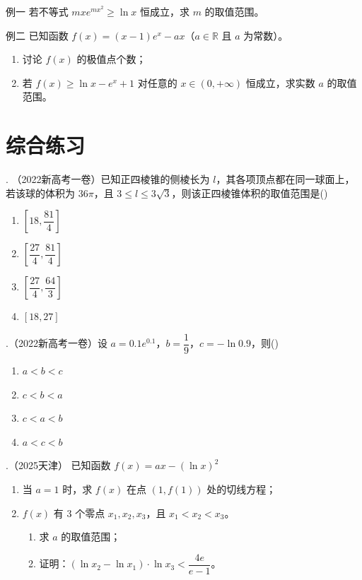 \documentclass{article}
\begin{document}
例一\;\; \noindent 若不等式 \(mx e^{mx^2} \geq \ln x\) 恒成立，求 \(m\) 的取值范围。
\vspace{10\baselineskip}

例二 \;\;已知函数 \(f(x) = (x-1)e^x - ax\)（\(a \in \mathbb{R}\) 且 \(a\) 为常数）。

\begin{enumerate}
    \item 讨论 \(f(x)\) 的极值点个数；
    \item 若 \(f(x) \geq \ln x - e^x + 1\) 对任意的 \(x \in (0,+\infty)\) 恒成立，求实数 \(a\) 的取值范围。
\end{enumerate}
\newpage
\section{综合练习}

. （2022新高考一卷）已知正四棱锥的侧棱长为 \(l\)，其各项顶点都在同一球面上，若该球的体积为 \(36\pi\)，且 \(3 \le l \le 3\sqrt{3}\)，则该正四棱锥体积的取值范围是(\;\;\;)

\begin{enumerate}[label=\Alph*., noitemsep]
    \item \(\left[18, \dfrac{81}{4}\right]\)
    \item \(\left[\dfrac{27}{4}, \dfrac{81}{4}\right]\)
    \item \(\left[\dfrac{27}{4}, \dfrac{64}{3}\right]\)
    \item \(\left[18, 27\right]\)
\end{enumerate}
\vspace{3\baselineskip}

.（2022新高考一卷）设 \(a = 0.1e^{0.1}\)，\(b = \dfrac{1}{9}\)，\(c = -\ln 0.9\)，则(\;\;\;)

\begin{enumerate}[label=\Alph*., noitemsep]
    \item \(a < b < c\)
    \item \(c < b < a\)
    \item \(c < a < b\)
    \item \(a < c < b\)
\end{enumerate}
\vspace{5\baselineskip}

.（2025天津） 已知函数 \(f(x) = ax - (\ln x)^2\)

\begin{enumerate}
    \item[(I)] 当 \(a=1\) 时，求 \(f(x)\) 在点 \((1, f(1))\) 处的切线方程；
    \item[(II)] \(f(x)\) 有 3 个零点 \(x_1, x_2, x_3\)，且 \(x_1 < x_2 < x_3\)。
    \begin{enumerate}
        \item[(i)] 求 \(a\) 的取值范围；
        \item[(ii)] 证明：\((\ln x_2 - \ln x_1) \cdot \ln x_3 < \dfrac{4e}{e-1}\)。
    \end{enumerate}
\end{enumerate}
\end{document}
